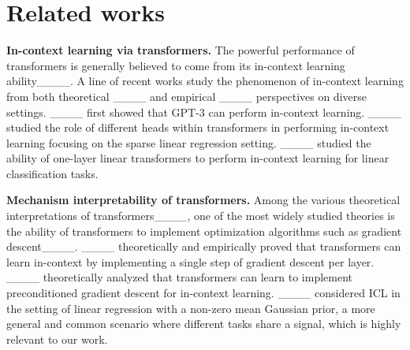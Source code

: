 \section{Related works}
\textbf{In-context learning via transformers.}
The powerful performance of transformers is generally believed to come from its in-context learning ability____. A line of recent works study the phenomenon of in-context learning from both theoretical ____ and empirical ____ perspectives on diverse settings. ____ first showed that GPT-3 can perform in-context learning. 
____ studied the role of different heads within transformers in performing in-context learning focusing on the sparse linear regression setting. ____ %
studied the ability of one-layer linear transformers to perform in-context learning for %
linear classification tasks. 



\textbf{Mechanism interpretability of transformers.}
Among the various theoretical interpretations of transformers____, one of the most widely studied theories is the ability of transformers to implement optimization algorithms such as gradient descent____.
____ theoretically and empirically proved that transformers can learn in-context by implementing a single step of gradient descent per layer. %
____ theoretically analyzed that transformers can learn to implement preconditioned gradient descent for in-context learning.%
____ considered ICL in the setting of linear regression with a non-zero mean Gaussian prior, a more general and common scenario where different tasks share a signal, which is highly relevant to our work.


